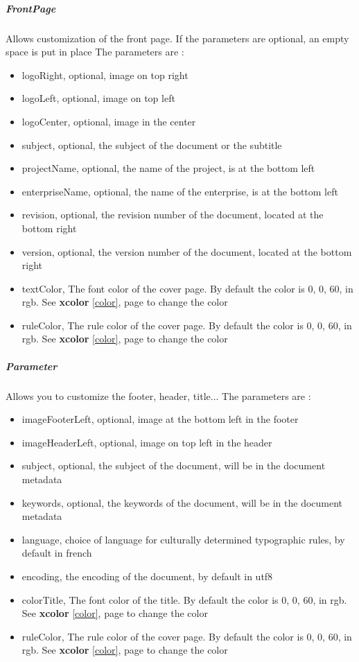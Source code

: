 \subparagraph{FrontPage}
Allows customization of the front page. If the parameters are optional, an empty space is put in place
The parameters are :
\begin{itemize}
    \item logoRight, optional, image on top right
    \item logoLeft, optional, image on top left
    \item logoCenter, optional, image in the center
    \item subject, optional, the subject of the document or the subtitle
    \item projectName, optional, the name of the project, is at the bottom left
    \item enterpriseName, optional, the name of the enterprise, is at the bottom left
    \item revision, optional, the revision number of the document, located at the bottom right
    \item version, optional, the version number of the document, located at the bottom right
    \item textColor, The font color of the cover page. By default the color is 0, 0, 60, in rgb. See \textbf{xcolor} \ref{color}, page \pageref{color} to change the color
    \item ruleColor, The rule color of the cover page. By default the color is 0, 0, 60, in rgb. See \textbf{xcolor} \ref{color}, page \pageref{color} to change the color
\end{itemize}

\subparagraph{Parameter}
Allows you to customize the footer, header, title...
The parameters are :
\begin{itemize}
    \item imageFooterLeft, optional, image at the bottom left in the footer
    \item imageHeaderLeft, optional, image on top left in the header
    \item subject, optional, the subject of the document, will be in the document metadata
    \item keywords, optional, the keywords of the document, will be in the document metadata
    \item language, choice of language for culturally determined typographic rules, by default in french
    \item encoding, the encoding of the document, by default in utf8
    \item colorTitle, The font color of the title. By default the color is 0, 0, 60, in rgb. See \textbf{xcolor} \ref{color}, page \pageref{color} to change the color
    \item ruleColor, The rule color of the cover page. By default the color is 0, 0, 60, in rgb. See \textbf{xcolor} \ref{color}, page \pageref{color} to change the color
\end{itemize}


